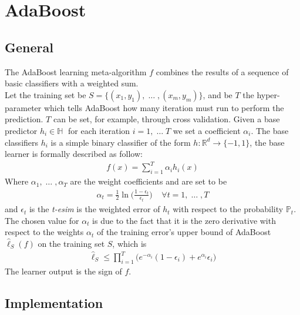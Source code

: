
\chapter{AdaBoost}
\section{General}
	The AdaBoost learning meta-algorithm $f$ combines the results of a sequence of basic classifiers with a weighted sum. \\
	Let the training set be $S=\lbrace (x_{1}, y_{1}),\; \dots\;, (x_{m}, y_{m}) \rbrace$, and be $T$ the hyper-parameter which tells AdaBoost how many iteration must run to perform the prediction. $T$ can be set, for example, through cross validation. Given a base predictor $h_{i} \in \mathbb{H}\;$ for each iteration $i = 1,\;\dots\;T$ we set a coefficient $\alpha_{i}$. The base classifiers $h_{i}$ is a simple binary classifier of the form $h:\mathbb{R}^{d}\to\lbrace-1, 1\rbrace$, the base learner is formally described as follow:
	\begin{align*}
		f(x) = \sum_{i=1}^{T}\alpha_{i}h_{i}(x)
	\end{align*}
	Where $\alpha_{1},\;\dots\;,\alpha_{T}$ are the weight coefficients and are set to be
	\begin{align*}
		\alpha_{t} = \frac{1}{2}\ln \Big( \frac{1-\epsilon_{t}}{\epsilon_{t}} \Big) \;\;\;\; \forall t=1,\;\dots\;,T
	\end{align*}
	and $\epsilon_{t}$ is the \textit{t-esim} is the weighted error of $h_{t}$ with respect to the probability $\mathbb{P}_{t}$. The chosen value for $\alpha_{t}$ is due to the fact that it is the zero derivative with respect to the weights $\alpha_{t}$ of the training error's upper bound of AdaBoost $\hat{\ell}_{S}(f)$ on the training set $S$, which is
	\begin{align*}
		\hat{\ell}_{S} \leq \prod_{i=1}^{T}\big( e^{-\alpha_{i}}(1-\epsilon_{i}) + e^{\alpha_{i}}\epsilon_{i} \big)
	\end{align*}
	The learner output is the sign of $f$.
	
\section{Implementation}